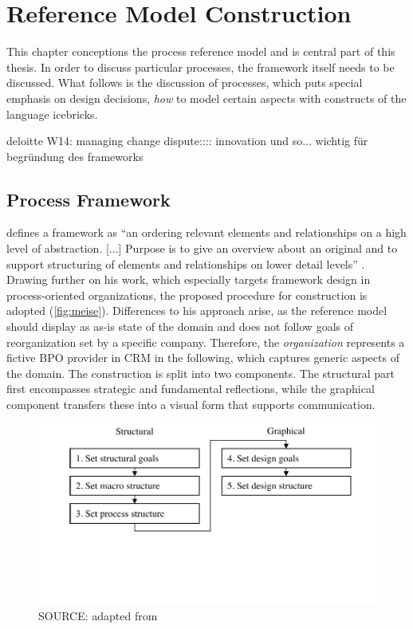 
\chapter{Reference Model Construction}

This chapter conceptions the process reference model and is central part of this thesis. In order to discuss particular processes, the framework itself needs to be discussed. What follows is the discussion of processes, which puts special emphasis on design decisions, \viz \textit{how} to model certain aspects with constructs of the language icebricks. 

	deloitte W14: managing change dispute:::: innovation und so... wichtig für begründung des frameworks
	\section{Process Framework}
	
	\citeauthor{Meise2001} defines a framework as \enquote{an ordering relevant elements and relationships on a high level of abstraction. [...] Purpose is to give an overview about an original and to support structuring of elements and relationships on lower detail levels} \citep[]{Meise2001}. Drawing further on his work, which especially targets framework design in process-oriented organizations, the proposed procedure for construction is adopted (\Fig \ref{fig:meise}). Differences to his approach arise, as the reference model should display as as-is state of the domain and does not follow goals of reorganization set by a specific company. Therefore, the \textit{organization} represents a fictive BPO provider in CRM in the following, which captures generic aspects of the domain. The construction is split into two components. The structural part first encompasses strategic and fundamental reflections, while the graphical component transfers these into a visual form that supports communication.

	\begin{figure}[caption={procedure for framework construction}, label={fig:meise}]
		{	\includegraphics[width=.8\textwidth]{figures/framework-meise.pdf}}
		\hspace{6.2cm}	SOURCE:  adapted from \citep[]{Meise2001}
	\end{figure} 
	
